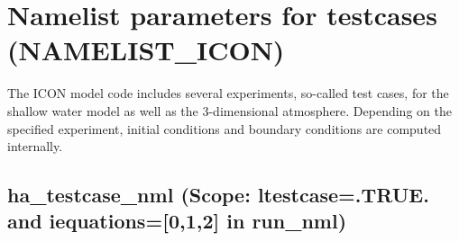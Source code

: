 \section{Namelist parameters for testcases (NAMELIST\_ICON)}

The ICON model code includes several experiments, so-called test cases,
for the shallow water model as well as the 3-dimensional atmosphere.
Depending on the specified experiment, initial conditions and boundary
conditions are computed internally.

\subsection{ha\_testcase\_nml (Scope: ltestcase=.TRUE. and iequations=[0,1,2] in run\_nml)}
